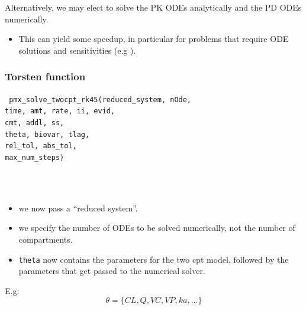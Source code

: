 \documentclass[xcolor=table]{beamer}
\begin{document}
\begin{frame}

  Alternatively, we may elect to solve the PK ODEs \textcolor{MRGGreen}{analytically} 
  and the PD ODEs \textcolor{MRGGreen}{numerically}.
  \begin{itemize}
    \item This can yield some speedup, in particular for problems that require ODE solutions
      and sensitivities (e.g \cite{Margossian:2017b}).
  \end{itemize}

\end{frame}

\begin{frame}
  \frametitle{Torsten function}
  
  \texttt{
  pmx\_solve\_\textcolor{MRGGreen}{twocpt}\_rk45(\textcolor{MRGGreen}{reduced\_system}, nOde, \\
  \hspace{4.3cm} time, amt, rate, ii, evid, \\ 
  \hspace{4.3cm} cmt, addl, ss, \\
  \hspace{4.3cm} theta, biovar, tlag, \\
  \hspace{4.3cm} rel\_tol, abs\_tol, \\
  \hspace{4.3cm} max\_num\_steps)
  }
  
  \ \\ \ \\
  \begin{itemize}
    \item we now pass a ``reduced system''.
    \item we specify the number of ODEs to be solved numerically, not
    the number of compartments.
  \end{itemize}

\end{frame}

\begin{frame}

  \begin{itemize}
    \item \texttt{theta} now contains the parameters for the two cpt model, followed
    by the parameters that get passed to the numerical solver.
  \end{itemize}
  
  E.g: \\
   $$ \theta = \{CL, Q, VC, VP, ka, ...\} $$

\end{frame}
\end{document}
